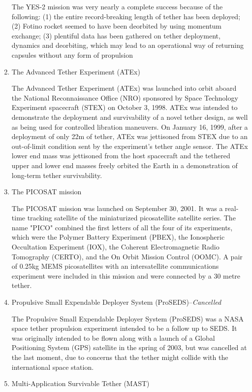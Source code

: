\begin{enumerate}
The YES-2 mission was very nearly a complete success because of the following: (1) the entire record-breaking length of tether has been deployed; (2) Fotino rocket seemed to have been deorbited by using momentum exchange; (3) plentiful data has been gathered on tether deployment, dynamics and deorbiting, which may lead to an operational way of returning capsules without any form of propulsion

\item{The Advanced Tether Experiment (ATEx)}

The Advanced Tether Experiment (ATEx) was launched into orbit aboard the National Reconnaissance Office (NRO) sponsored by Space Technology Experiment spacecraft (STEX) on October 3, 1998. ATEx was intended to demonstrate the deployment and survivability of a novel tether design, as well as being used for controlled libration maneuvers. On January 16, 1999, after a deployment of only 22m of tether, ATEx was jettisoned from STEX due to an out-of-limit condition sent by the experiment's tether angle sensor. The ATEx lower end mass was jettisoned from the host spacecraft and the tethered upper and lower end masses freely orbited the Earth in a demonstration of long-term tether survivability. 
\item{The PICOSAT mission}

The PICOSAT mission was launched on September 30, 2001. It was a real-time tracking satellite of the miniaturized picosatellite satellite series. The name "PICO" combined the first letters of all the four of its experiments, which were the Polymer Battery Experiment (PBEX), the Ionospheric Occultation Experiment (IOX), the Coherent Electromagnetic Radio Tomography (CERTO), and the On Orbit Mission Control (OOMC). A pair of 0.25kg MEMS picosatellites with an intersatellite communications experiment were included in this mission and were connected by a 30 metre tether.
\item{Propulsive Small Expendable Deployer System (ProSEDS)--\em{Cancelled}}
	
The Propulsive Small Expendable Deployer System (ProSEDS) was a NASA space tether propulsion experiment intended to be a follow up to SEDS. It was originally intended to be flown along with a launch of a Global Positioning System (GPS) satellite in the spring of 2003, but was cancelled at the last moment, due to concerns that the tether might collide with the international space station.

\item{Multi-Application Survivable Tether (MAST)}


\end{enumerate}
